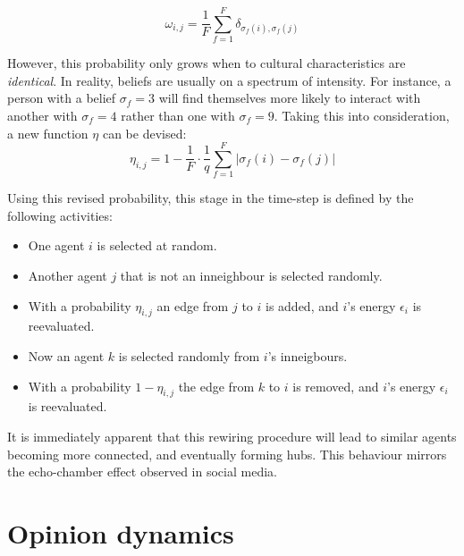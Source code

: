 \documentclass[12pt,openright,twoside]{book}
\begin{document}
\begin{equation}
\omega_{i,j}=\frac{1}{F}\sum_{f=1}^{F}\delta_{\sigma_f(i),\sigma_f(j)}
\label{ax_trans_prob}
\end{equation}

\vspace{14pt}

However, this probability only grows when to cultural characteristics are \textit{identical}. In reality, beliefs are usually on a spectrum of intensity. For instance, a person with a belief $\sigma_f=3$ will find themselves more likely to interact with another with $\sigma_f=4$ rather than one with $\sigma_f=9$. Taking this into consideration, a new function $\eta$ can be devised:\\

\begin{equation}
\eta_{i,j}=1-\frac{1}{F} \cdot \frac{1}{q}\sum_{f=1}^{F}|\sigma_f(i)-\sigma_f(j)|
\label{trans_prob}
\end{equation}

\vspace{14pt}

Using this revised probability, this stage in the time-step is defined by the following activities:\\

\begin{itemize}
    \item One agent $i$ is selected at random.
    \item Another agent $j$ that is not an inneighbour is selected randomly.
    \item With a probability $\eta_{i,j}$ an edge from $j$ to $i$ is added, and $i$'s energy $\epsilon_i$ is reevaluated.
    \item Now an agent $k$ is selected randomly from $i$'s inneigbours.
    \item With a probability $1-\eta_{i,j}$ the edge from $k$ to $i$ is removed, and $i$'s energy $\epsilon_i$ is reevaluated. 
\end{itemize}

\vspace{14pt}

It is immediately apparent that this rewiring procedure will lead to similar agents becoming more connected, and eventually forming hubs. This behaviour mirrors the echo-chamber effect observed in social media.\\

\section{Opinion dynamics}
\end{document}
